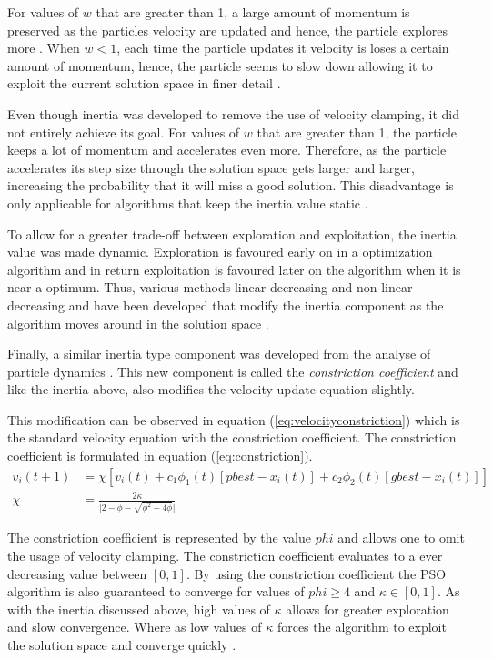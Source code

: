 For values of $w$ that are greater than 1, a large amount of momentum is preserved as the particles velocity are updated and hence, the particle explores more \cite{FundamentalSwarm}. When $w < 1$, each time the particle updates it velocity is loses a certain amount of momentum, hence, the particle seems to slow down allowing it to exploit the current solution space in finer detail \cite{FundamentalSwarm}.

Even though inertia was developed to remove the use of velocity clamping, it did not entirely achieve its goal. For values of $w$ that are greater than 1, the particle keeps a lot of momentum and accelerates even more. Therefore, as the particle accelerates its step size through the solution space gets larger and larger, increasing the probability that it will miss a good solution. This disadvantage is only applicable for algorithms that keep the inertia value static \cite{CompuIntelligenceIntro,FundamentalSwarm}.

To allow for a greater trade-off between exploration and exploitation, the inertia value was made dynamic. Exploration is favoured early on in a optimization algorithm and in return exploitation is favoured later on the algorithm when it is near a optimum. Thus, various methods linear decreasing and non-linear decreasing and have been developed that modify the inertia component as the algorithm moves around in the solution space \cite{CompuIntelligenceIntro,FundamentalSwarm}.

Finally, a similar inertia type component was developed from the analyse of particle dynamics \cite{FundamentalSwarm}. This new component is called the \emph{constriction coefficient} and like the inertia above, also modifies the velocity update equation slightly\cite{adaptPSO,FundamentalSwarm,CompuIntelligenceIntro}. 

This modification can be observed in equation (\ref{eq:velocityconstriction}) which is the standard velocity equation with the constriction coefficient. The constriction coefficient is formulated in equation (\ref{eq:constriction})\cite{adaptPSO,FundamentalSwarm,CompuIntelligenceIntro}.
\begin{align}
v_i(t+1) &= \chi[v_i(t) + c_1\phi_{1}(t)[pbest - x_i(t)] + c_2\phi_{2}(t)[gbest - x_i(t)]]\label{eq:velocityconstriction}\\
\chi &= \frac{2\kappa}{\lvert 2 - \phi - \sqrt{\phi^2 - 4\phi}\rvert}\label{eq:constriction}
\end{align}

The constriction coefficient is represented by the value $phi$ and allows one to omit the usage of velocity clamping. The constriction coefficient evaluates to a ever decreasing value between $[0,1]$. By using the constriction coefficient the PSO algorithm is also guaranteed to converge for values of $phi \geq 4$ and $\kappa \in [0,1]$. As with the inertia discussed above, high values of $\kappa$ allows for greater exploration and slow convergence. Where as low values of $\kappa$ forces the algorithm to exploit the solution space and converge quickly \cite{adaptPSO,FundamentalSwarm,CompuIntelligenceIntro}.
